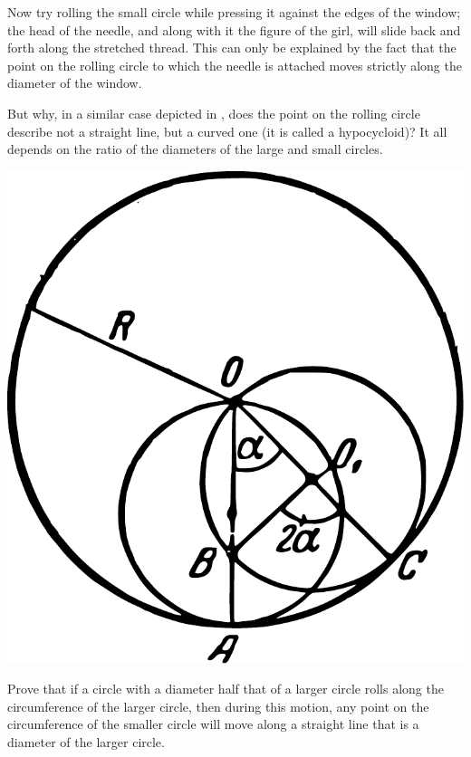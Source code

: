 Now try rolling the small circle while pressing it against the edges of the window; the head of the needle, and along with it the figure of the girl, will slide back and forth along the stretched thread. This can only be explained by the fact that the point on the rolling circle to which the needle is attached moves strictly along the diameter of the window.

But why, in a similar case depicted in , does the point on the rolling circle describe not a straight line, but a curved one (it is called a hypocycloid)? It all depends on the ratio of the diameters of the large and small circles. 

\begin{marginfigure}[-2cm]%
\centering
\includegraphics[width=\textwidth]{figures/ch-09/fig-133.pdf}
\end{marginfigure}

\ques Prove that if a circle with a diameter half that of a larger circle rolls along the circumference of the larger circle, then during this motion, any point on the circumference of the smaller circle will move along a straight line that is a diameter of the larger circle.



